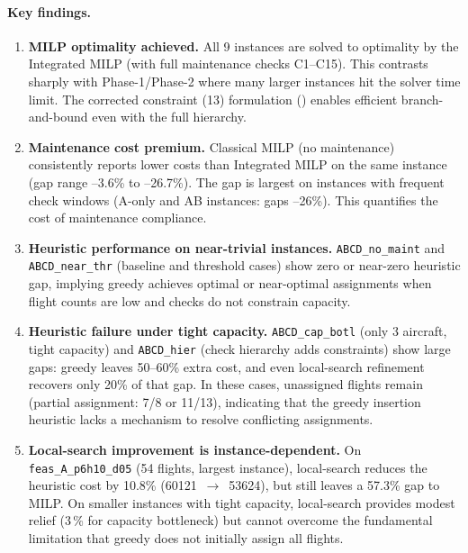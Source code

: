 \paragraph{Key findings.}
\begin{enumerate}
  \item \textbf{MILP optimality achieved.} All 9 instances are solved to
    optimality by the Integrated MILP (with full maintenance checks C1--C15).
    This contrasts sharply with Phase-1/Phase-2 where many larger instances
    hit the solver time limit. The corrected constraint (13) formulation
    () enables efficient branch-and-bound even
    with the full hierarchy.
  \item \textbf{Maintenance cost premium.} Classical MILP (no maintenance)
    consistently reports lower costs than Integrated MILP on the same instance
    (gap range --3.6\% to --26.7\%). The gap is largest on instances with
    frequent check windows (A-only and AB instances: gaps --26\%).  This
    quantifies the cost of maintenance compliance.
  \item \textbf{Heuristic performance on near-trivial instances.}
    \texttt{ABCD\_no\_maint} and \texttt{ABCD\_near\_thr} (baseline and
    threshold cases) show zero or near-zero heuristic gap, implying greedy
    achieves optimal or near-optimal assignments when flight counts are low and
    checks do not constrain capacity.
  \item \textbf{Heuristic failure under tight capacity.}
    \texttt{ABCD\_cap\_botl} (only 3 aircraft, tight capacity) and
    \texttt{ABCD\_hier} (check hierarchy adds constraints) show large gaps:
    greedy leaves 50--60\% extra cost, and even local-search refinement
    recovers only 20\% of that gap. In these cases, unassigned flights remain
    (partial assignment: 7/8 or 11/13), indicating that the greedy insertion
    heuristic lacks a mechanism to resolve conflicting assignments.
  \item \textbf{Local-search improvement is instance-dependent.}
    On \texttt{feas\_A\_p6h10\_d05} (54 flights, largest instance),
    local-search reduces the heuristic cost by 10.8\% (60121 \,\(\rightarrow\)\, 53624),
    but still leaves a 57.3\% gap to MILP. On smaller instances with tight
    capacity, local-search provides modest relief (3\,\% for capacity
    bottleneck) but cannot overcome the fundamental limitation that greedy does
    not initially assign all flights.
\end{enumerate}

